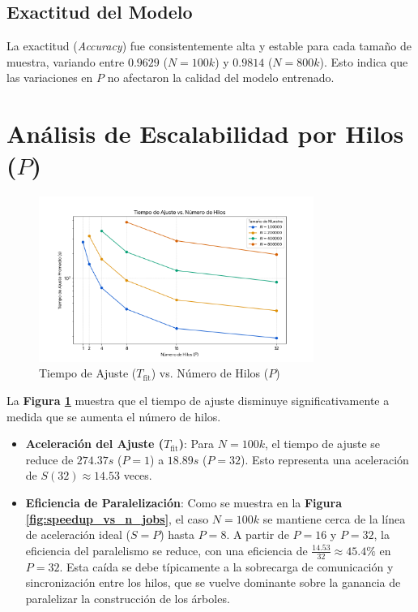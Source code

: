 \documentclass{article}
\begin{document}
\subsection{Exactitud del Modelo}
La exactitud (\textit{Accuracy}) fue consistentemente alta y estable para cada tamaño de muestra, variando entre $0.9629$ ($N=100k$) y $0.9814$ ($N=800k$). Esto indica que las variaciones en $P$ no afectaron la calidad del modelo entrenado.

\section{Análisis de Escalabilidad por Hilos ($P$)}

\begin{figure}[H]
    \centering
    \includegraphics[width=0.8\textwidth]{fit_time_vs_n_samples_p32.png}
    \caption{Tiempo de Ajuste ($T_{\text{fit}}$) vs. Número de Hilos ($P$)}
    \label{fig:fit_time_vs_n_jobs}
\end{figure}

La \textbf{Figura \ref{fig:fit_time_vs_n_jobs}} muestra que el tiempo de ajuste disminuye significativamente a medida que se aumenta el número de hilos.

\begin{itemize}
    \item \textbf{Aceleración del Ajuste ($T_{\text{fit}}$)}: Para $N=100k$, el tiempo de ajuste se reduce de $274.37s$ ($P=1$) a $18.89s$ ($P=32$). Esto representa una aceleración de $S(32) \approx 14.53$ veces.
    \item \textbf{Eficiencia de Paralelización}: Como se muestra en la \textbf{Figura \ref{fig:speedup_vs_n_jobs}}, el caso $N=100k$ se mantiene cerca de la línea de aceleración ideal ($S=P$) hasta $P=8$. A partir de $P=16$ y $P=32$, la eficiencia del paralelismo se reduce, con una eficiencia de $\frac{14.53}{32} \approx 45.4\%$ en $P=32$. Esta caída se debe típicamente a la sobrecarga de comunicación y sincronización entre los hilos, que se vuelve dominante sobre la ganancia de paralelizar la construcción de los árboles.
\end{itemize}
\end{document}

